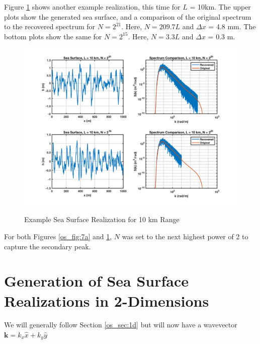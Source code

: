 Figure \ref{os_fig:7aa} shows another example realization, this time for $L$ = 10km. The upper plots show the generated sea surface, and a comparison of the original spectrum to the recovered spectrum for $N = 2^{21}$. Here, $N = 209.7L$ and $\Delta x$ = 4.8 mm. The bottom plots show the same for $N=2^{15}$. Here, $N = 3.3L$ and $\Delta x$ = 0.3 m.
\begin{figure}[H]
  \begin{center}
\includegraphics[width=6in]{../media/Ocean_Surface/sea_surface_10000.png}
  \end{center}
  \renewcommand{\baselinestretch}{1} \small\normalsize
  \begin{quote}
    \caption[Example Sea Surface Realization for 10 km Range]{Example Sea Surface Realization for 10 km Range\label{os_fig:7aa}}
  \end{quote}
\end{figure}
\renewcommand{\baselinestretch}{2} \small\normalsize
For both Figures \ref{os_fig:7a} and \ref{os_fig:7aa}, $N$ was set to the next highest power of 2 to capture the secondary peak.

\section{Generation of Sea Surface Realizations in 2-Dimensions}
We will generally follow Section \ref{os_sec:1d} but will now have a wavevector $\mathbf{k} = k_x\hat{x} + k_y\hat{y}$

